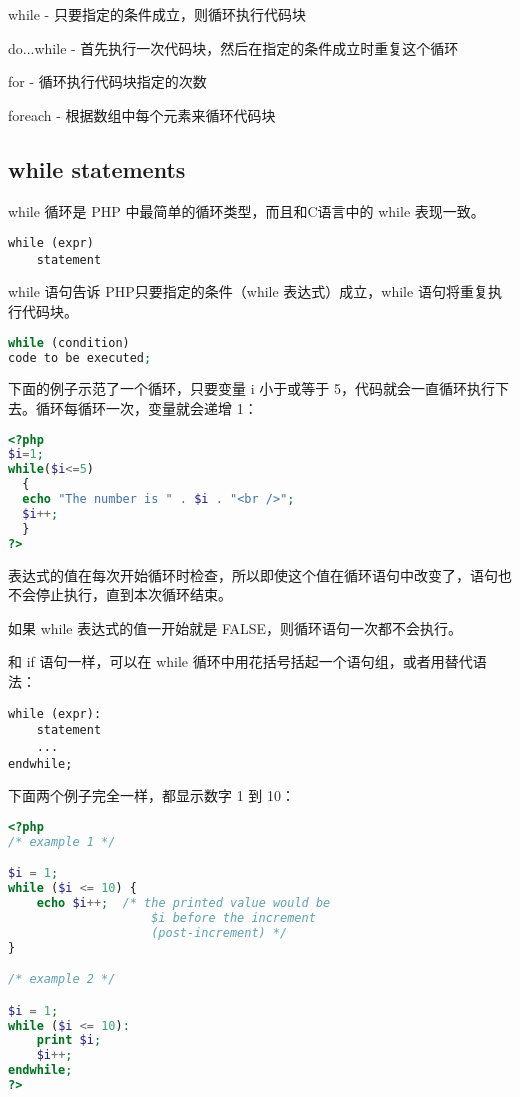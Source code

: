 \begin{compactitem}
\item while - 只要指定的条件成立，则循环执行代码块
\item do...while - 首先执行一次代码块，然后在指定的条件成立时重复这个循环
\item for - 循环执行代码块指定的次数
\item foreach - 根据数组中每个元素来循环代码块
\end{compactitem}



\subsection{while statements}

while 循环是 PHP 中最简单的循环类型，而且和C语言中的 while 表现一致。

\begin{verbatim}
while (expr)
    statement
\end{verbatim}

while 语句告诉 PHP只要指定的条件（while 表达式）成立，while 语句将重复执行代码块。


\begin{lstlisting}[language=PHP]
while (condition)
code to be executed;
\end{lstlisting}

下面的例子示范了一个循环，只要变量 i 小于或等于 5，代码就会一直循环执行下去。循环每循环一次，变量就会递增 1：

\begin{lstlisting}[language=PHP]
<?php 
$i=1;
while($i<=5)
  {
  echo "The number is " . $i . "<br />";
  $i++;
  }
?>
\end{lstlisting}

表达式的值在每次开始循环时检查，所以即使这个值在循环语句中改变了，语句也不会停止执行，直到本次循环结束。

如果 while 表达式的值一开始就是 FALSE，则循环语句一次都不会执行。

和 if 语句一样，可以在 while 循环中用花括号括起一个语句组，或者用替代语法：

\begin{verbatim}
while (expr):
    statement
    ...
endwhile;
\end{verbatim}

下面两个例子完全一样，都显示数字 1 到 10：

\begin{lstlisting}[language=PHP]
<?php
/* example 1 */

$i = 1;
while ($i <= 10) {
    echo $i++;  /* the printed value would be
                    $i before the increment
                    (post-increment) */
}

/* example 2 */

$i = 1;
while ($i <= 10):
    print $i;
    $i++;
endwhile;
?>
\end{lstlisting}

